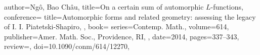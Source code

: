 \documentclass[11pt]{amsart}
\theoremstyle{remark}
\begin{document}
\begin{bibdiv}
\begin{biblist}
%        
%       
%    
%       
	    
   {
       author={Ng\^o, Bao Ch\^au},
       title={On a certain sum of automorphic $L$-functions},
       conference={
       title={Automorphic forms and related geometry: assessing the legacy of
          I. I. Piatetski-Shapiro},
          },
       book={
          series={Contemp. Math.},
          volume={614},
          publisher={Amer. Math. Soc., Providence, RI},
       },
       date={2014},
       pages={337--343},
       review={},
       doi={10.1090/conm/614/12270},
    }


\end{biblist}
\end{bibdiv}
\end{document}
